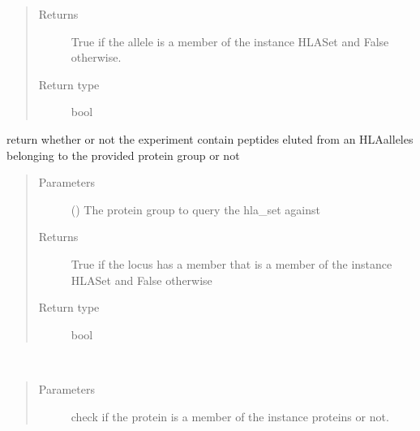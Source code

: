 \documentclass[letterpaper,10pt,english]{sphinxmanual}
\begin{document}
\begin{fulllineitems}
\begin{fulllineitems}
\begin{quote}
\begin{description}
\item[{Returns}] \leavevmode
True if the allele is a member of the instance HLASet and False otherwise.

\item[{Return type}] \leavevmode
bool

\end{description}\end{quote}

\end{fulllineitems}


\begin{fulllineitems}
\label{\detokenize{IPTK.Classes:IPTK.Classes.Experiment.Experiment.has_protein_group}}
return whether or not the experiment contain peptides eluted from an HLA\sphinxhyphen{}alleles belonging to the provided protein group or not
\begin{quote}\begin{description}
\item[{Parameters}] \leavevmode
{} () \textendash{} The protein group to query the hla\_set against

\item[{Returns}] \leavevmode
True if the locus has a member that is a member of the instance HLASet and False otherwise

\item[{Return type}] \leavevmode
bool

\end{description}\end{quote}

\end{fulllineitems}


\begin{fulllineitems}
\label{\detokenize{IPTK.Classes:IPTK.Classes.Experiment.Experiment.is_a_parent_protein}}~\begin{quote}\begin{description}
\item[{Parameters}] \leavevmode
{} \textendash{} check if the protein is a member of the instance proteins or not.


\end{description}
\end{quote}
\end{fulllineitems}
\end{fulllineitems}
\end{document}
